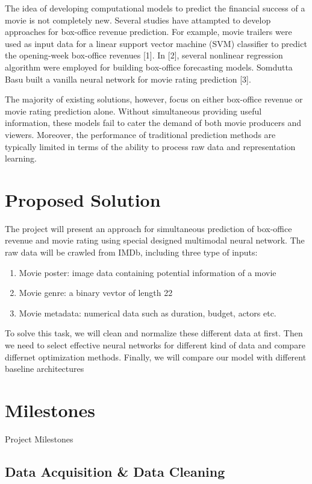 \documentclass[conference]{IEEEtran}
\begin{document}
The idea of developing computational models to predict the financial success of a movie is not completely new.
Several studies have attampted to develop approaches for box-office revenue prediction. For example, movie trailers
were used as input data for a linear support vector machine (SVM) classifier to predict the opening-week box-office revenues [1].
In [2], several nonlinear regression algorithm were employed for building box-office forecasting models. Somdutta Basu built a
vanilla neural network for movie rating prediction [3].

The majority of existing solutions, however, focus on either box-office revenue or movie rating prediction alone. 
Without simultaneous providing useful information, these models fail to cater the demand of both movie producers and viewers.
Moreover, the performance of traditional prediction methods are typically limited in terms of the ability to process raw data and representation learning.

\section{Proposed Solution}

The project will present an approach for simultaneous prediction of box-office revenue and movie rating using 
special designed multimodal neural network. The raw data will be crawled from IMDb, including three type of inputs:

\begin{enumerate}
  \item Movie poster: image data containing potential information of a movie
  \item Movie genre: a binary vevtor of length 22
  \item Movie metadata: numerical data such as duration, budget, actors etc.
\end{enumerate}

To solve this task, we will clean and normalize these different data at first. Then we need to 
select effective neural networks for different kind of data and compare differnet optimization methods.
Finally, we will compare our model with different baseline architectures

\section{Milestones}

Project Milestones

\subsection{Data Acquisition \& Data Cleaning}
\end{document}
